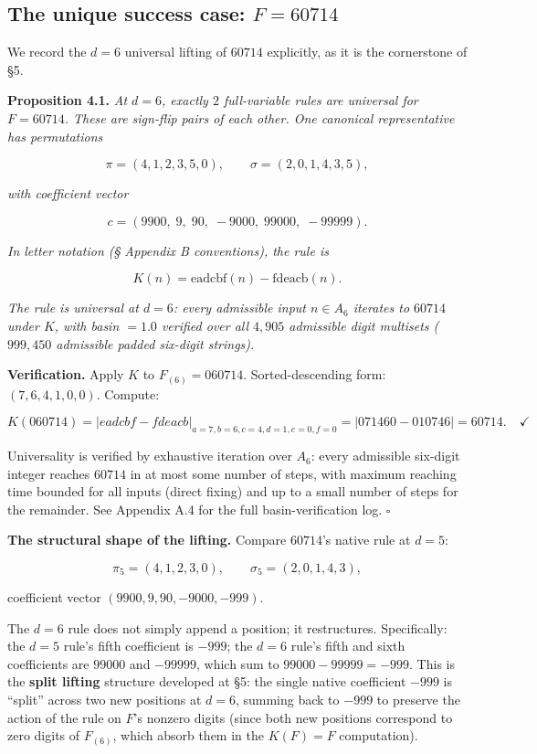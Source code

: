 \documentclass[11pt,letterpaper]{article}
\theoremstyle{paperstyle}
\theoremstyle{paperstyledef}
\theoremstyle{paperstylerem}
\begin{document}
\hypertarget{the-unique-success-case-f-60714}{%
\subsection{\texorpdfstring{The unique success case: \(F = 60714\)}{The unique success case: F = 60714}}\label{the-unique-success-case-f-60714}}

We record the \(d = 6\) universal lifting of \(60714\) explicitly, as it
is the cornerstone of §5.

\textbf{Proposition 4.1.} \emph{At \(d = 6\), exactly \(2\)
full-variable rules are universal for \(F = 60714\). These are sign-flip
pairs of each other. One canonical representative has permutations}

\[\pi = (4, 1, 2, 3, 5, 0), \qquad \sigma = (2, 0, 1, 4, 3, 5),\]

\emph{with coefficient vector}

\[c = (9900,\; 9,\; 90,\; -9000,\; 99000,\; -99999).\]

\emph{In letter notation (§ Appendix B conventions), the rule is}

\[K(n) = \mathrm{eadcbf}(n) - \mathrm{fdeacb}(n).\]

\emph{The rule is universal at \(d = 6\): every admissible input
\(n \in A_6\) iterates to \(60714\) under \(K\), with basin \(= 1.0\)
verified over all \(4{,}905\) admissible digit multisets (\(999{,}450\)
admissible padded six-digit strings).}

\textbf{Verification.} Apply \(K\) to \(F_{(6)} = 060714\).
Sorted-descending form: \((7, 6, 4, 1, 0, 0)\). Compute:

\[K(060714) = |eadcbf - fdeacb|_{a=7, b=6, c=4, d=1, e=0, f=0} = |071460 - 010746| = 60714. \quad \checkmark\]

Universality is verified by exhaustive iteration over \(A_6\): every
admissible six-digit integer reaches \(60714\) in at most some number of
steps, with maximum reaching time bounded for all inputs (direct fixing)
and up to a small number of steps for the remainder. See Appendix A.4
for the full basin-verification log. \(\square\)

\textbf{The structural shape of the lifting.} Compare \(60714\)'s native
rule at \(d = 5\):

\[\pi_5 = (4, 1, 2, 3, 0), \qquad \sigma_5 = (2, 0, 1, 4, 3),\]

coefficient vector \((9900, 9, 90, -9000, -999)\).

The \(d = 6\) rule does not simply append a position; it restructures.
Specifically: the \(d = 5\) rule's fifth coefficient is \(-999\); the
\(d = 6\) rule's fifth and sixth coefficients are \(99000\) and
\(-99999\), which sum to \(99000 - 99999 = -999\). This is the
\textbf{split lifting} structure developed at §5: the single native
coefficient \(-999\) is ``split'' across two new positions at \(d = 6\),
summing back to \(-999\) to preserve the action of the rule on \(F\)'s
nonzero digits (since both new positions correspond to zero digits of
\(F_{(6)}\), which absorb them in the \(K(F) = F\) computation).
\end{document}
